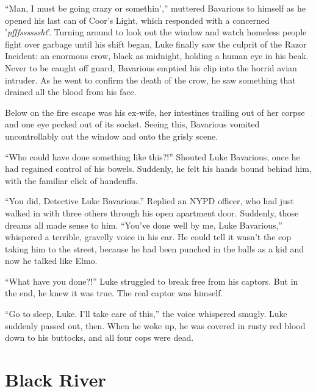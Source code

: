 ``Man, I must be going crazy or somethin','' muttered Bavarious to
himself as he opened his last can of Coor's Light, which responded
with a concerned '{\em pfffssssssht}'. Turning around to look out
the window and watch homeless people fight over garbage until his
shift began, Luke finally saw the culprit of the Razor Incident: an
enormous crow, black as midnight, holding a human eye in his beak.
Never to be caught off guard, Bavarious emptied his clip into the
horrid avian intruder. As he went to confirm the death of the crow,
he saw something that drained all the blood from his face.



Below on the fire escape was his ex-wife, her intestines trailing
out of her corpse and one eye pecked out of its socket. Seeing
this, Bavarious vomited uncontrollably out the window and onto the
grisly scene.



``Who could have done something like this?!'' Shouted Luke Bavarious,
once he had regained control of his bowels. Suddenly, he felt his
hands bound behind him, with the familiar click of handcuffs.



``You did, Detective Luke Bavarious.'' Replied an NYPD officer, who
had just walked in with three others through his open apartment
door. Suddenly, those dreams all made sense to him. ``You've done
well by me, Luke Bavarious,'' whispered a terrible, gravelly voice
in his ear. He could tell it wasn't the cop taking him to the
street, because he had been punched in the balls as a kid and now
he talked like Elmo.



``What have you done?!'' Luke struggled to break free from his
captors. But in the end, he knew it was true. The real captor was
himself.



``Go to sleep, Luke. I'll take care of this,'' the voice whispered
smugly. Luke suddenly passed out, then. When he woke up, he was
covered in rusty red blood down to his buttocks, and all four cops
were dead. 
 



\chapter{Black River}





